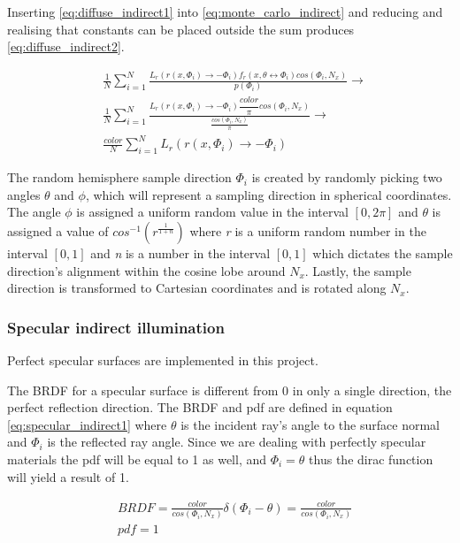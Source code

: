 \documentclass[a4paper, 12pt]{report}
\begin{document}
Inserting \autoref{eq:diffuse_indirect1} into \autoref{eq:monte_carlo_indirect} and reducing and realising that constants can be placed outside the sum produces \autoref{eq:diffuse_indirect2}.

\begin{subequations} \label{eq:diffuse_indirect2}
\begin{align}
&\nonumber \frac{1}{N} \sum^{N}_{i=1} \frac{L_r(r(x,\Phi_i) \rightarrow -\Phi_i) f_r(x, \theta \leftrightarrow \Phi_i)cos(\Phi_i, N_x)}{p(\Phi_i)} \rightarrow \\
&\nonumber \frac{1}{N} \sum^{N}_{i=1} \frac{L_r(r(x,\Phi_i) \rightarrow -\Phi_i)  \dfrac{color}{\pi} cos(\Phi_i, N_x)}{\frac{cos(\Phi_i, N_x)}{\pi}} \rightarrow \\
&\frac{color}{N} \sum^{N}_{i=1} L_r(r(x,\Phi_i) \rightarrow -\Phi_i)
\end{align}
\end{subequations}

The random hemisphere sample direction $\Phi_i$ is created by randomly picking two angles $\theta$ and $\phi$, which will represent a sampling direction in spherical coordinates.
The angle $\phi$ is assigned a uniform random value in the interval $[0,2\pi]$ and $\theta$ is assigned a value of $cos^{-1}(r^{ \frac{1}{1+n} })$ where \emph{r} is a uniform random number in the interval $[0,1]$ and \emph{n} is a number in the interval $[0,1]$ which dictates the sample direction's alignment within the cosine lobe around $N_x$. 
Lastly, the sample direction is transformed to Cartesian coordinates and is rotated along $N_x$.

\subsubsection{Specular indirect illumination}
Perfect specular surfaces are implemented in this project.

The BRDF for a specular surface is different from 0 in only a single direction, the perfect reflection direction. 
The BRDF and pdf are defined in equation \autoref{eq:specular_indirect1} where $\theta$ is the incident ray's angle to the surface normal and $\Phi_i$ is the reflected ray angle.
Since we are dealing with perfectly specular materials the pdf will be equal to 1 as well, and $\Phi_i = \theta$ thus the dirac function will yield a result of 1.

\begin{subequations} \label{eq:specular_indirect1}
\begin{align}
	&BRDF = \frac{color}{cos(\Phi_i, N_x)}\delta(\Phi_i - \theta) = \frac{color}{cos(\Phi_i, N_x)} \\
	&pdf = 1
\end{align}
\end{subequations}
\end{document}
